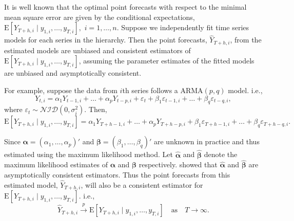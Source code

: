\documentclass[a4paper, 11pt]{article}
\def\E{\text{E}}
\theoremstyle{theo}
\theoremstyle{definition}
\begin{document}
It is well known that the optimal point forecasts with respect to the minimal mean square error are given by the conditional expectations, $\E[Y_{T+h,i}\mid y_{1,i},\dots,y_{T,i}],$ $i=1,\dots,n$. Suppose we independently fit time series models for each series in the hierarchy. Then the point forecasts, $\hat{Y}_{T+h,i}$, from the estimated models are unbiased and consistent estimators of $\E[Y_{T+h,i}\mid y_{1,i},\dots,y_{T,i}]$, assuming the parameter estimates of the fitted models are unbiased and asymptotically consistent. 

For example, suppose the data from $i$th series follows a ARMA$(p,q)$ model. i.e.,
$$
Y_{t,i}=\alpha_1Y_{t-1,i}+\dots+\alpha_pY_{t-p,i}+\varepsilon_t + \beta_1\varepsilon_{t-1,i}+\dots+\beta_q\varepsilon_{t-q,i},
$$
where $\varepsilon_t \sim \mathcal{NID}(0, \sigma_i^2)$. Then,
$$
\E[Y_{T+h,i}\mid y_{1,i},\dots,y_{T,i}] = \alpha_1Y_{T+h-1,i}+\dots+\alpha_pY_{T+h-p,i}+ \beta_1\varepsilon_{T+h-1,i}+\dots+\beta_q\varepsilon_{T+h-q,i}.
$$

Since $\bm{\alpha} = (\alpha_1,\dots,\alpha_p)'$ and $\bm{\beta} = (\beta_1,\dots,\beta_q)'$ are unknown in practice and thus estimated using the maximum likelihood method. Let $\bm{\hat{\alpha}}$ and $\bm{\hat{\beta}}$ denote the maximum likelihood estimates of $\bm{\alpha}$ and $\bm{\beta}$ respectively. \citet{Yao2006} showed that $\bm{\hat{\alpha}}$ and $\bm{\hat{\beta}}$ are asymptotically consistent estimators. Thus the point forecasts from this estimated model, $\hat{Y}_{T+h,i}$, will also be a consistent estimator for $\E[Y_{T+h,i}\mid y_{1,i},\dots,y_{T,i}]$. i.e.,
\begin{equation} \label{eq:(6.01)}
\hat{Y}_{T+h,i} \overset{p}{\to} \E[Y_{T+h,i}\mid y_{1,i},\dots,y_{T,i}] \quad \text{as} \quad T \to \infty.
\end{equation}
\end{document}
